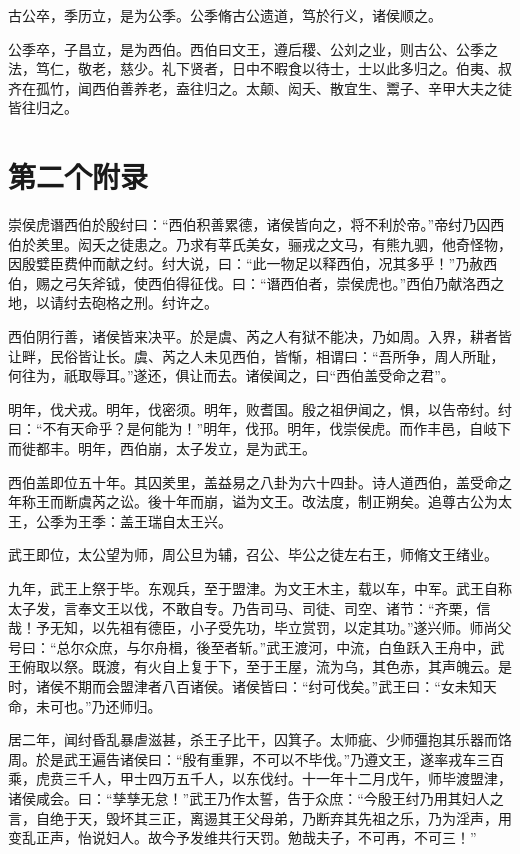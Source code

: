 \documentclass[UTF8,12pt,AutoFakeBold]{ctexart}
\begin{document}
\begin{appendices}
    古公卒，季历立，是为公季。公季脩古公遗道，笃於行义，诸侯顺之。
    
    公季卒，子昌立，是为西伯。西伯曰文王，遵后稷、公刘之业，则古公、公季之法，笃仁，敬老，慈少。礼下贤者，日中不暇食以待士，士以此多归之。伯夷、叔齐在孤竹，闻西伯善养老，盍往归之。太颠、闳夭、散宜生、鬻子、辛甲大夫之徒皆往归之。
    
    \pagebreak %
    
    \section{第二个附录\label{附录：第二个附录}}
    崇侯虎谮西伯於殷纣曰：“西伯积善累德，诸侯皆向之，将不利於帝。”帝纣乃囚西伯於羑里。闳夭之徒患之。乃求有莘氏美女，骊戎之文马，有熊九驷，他奇怪物，因殷嬖臣费仲而献之纣。纣大说，曰：“此一物足以释西伯，况其多乎！”乃赦西伯，赐之弓矢斧钺，使西伯得征伐。曰：“谮西伯者，崇侯虎也。”西伯乃献洛西之地，以请纣去砲格之刑。纣许之。
    
    西伯阴行善，诸侯皆来决平。於是虞、芮之人有狱不能决，乃如周。入界，耕者皆让畔，民俗皆让长。虞、芮之人未见西伯，皆惭，相谓曰：“吾所争，周人所耻，何往为，祇取辱耳。”遂还，俱让而去。诸侯闻之，曰“西伯盖受命之君”。
    
    明年，伐犬戎。明年，伐密须。明年，败耆国。殷之祖伊闻之，惧，以告帝纣。纣曰：“不有天命乎？是何能为！”明年，伐邘。明年，伐崇侯虎。而作丰邑，自岐下而徙都丰。明年，西伯崩，太子发立，是为武王。
    
    西伯盖即位五十年。其囚羑里，盖益易之八卦为六十四卦。诗人道西伯，盖受命之年称王而断虞芮之讼。後十年而崩，谥为文王。改法度，制正朔矣。追尊古公为太王，公季为王季：盖王瑞自太王兴。
    
    武王即位，太公望为师，周公旦为辅，召公、毕公之徒左右王，师脩文王绪业。
    
    九年，武王上祭于毕。东观兵，至于盟津。为文王木主，载以车，中军。武王自称太子发，言奉文王以伐，不敢自专。乃告司马、司徒、司空、诸节：“齐栗，信哉！予无知，以先祖有德臣，小子受先功，毕立赏罚，以定其功。”遂兴师。师尚父号曰：“总尔众庶，与尔舟楫，後至者斩。”武王渡河，中流，白鱼跃入王舟中，武王俯取以祭。既渡，有火自上复于下，至于王屋，流为乌，其色赤，其声魄云。是时，诸侯不期而会盟津者八百诸侯。诸侯皆曰：“纣可伐矣。”武王曰：“女未知天命，未可也。”乃还师归。
    
    居二年，闻纣昏乱暴虐滋甚，杀王子比干，囚箕子。太师疵、少师彊抱其乐器而饹周。於是武王遍告诸侯曰：“殷有重罪，不可以不毕伐。”乃遵文王，遂率戎车三百乘，虎贲三千人，甲士四万五千人，以东伐纣。十一年十二月戊午，师毕渡盟津，诸侯咸会。曰：“孳孳无怠！”武王乃作太誓，告于众庶：“今殷王纣乃用其妇人之言，自绝于天，毁坏其三正，离逷其王父母弟，乃断弃其先祖之乐，乃为淫声，用变乱正声，怡说妇人。故今予发维共行天罚。勉哉夫子，不可再，不可三！”
    \pagebreak
\end{appendices}
\end{document}
